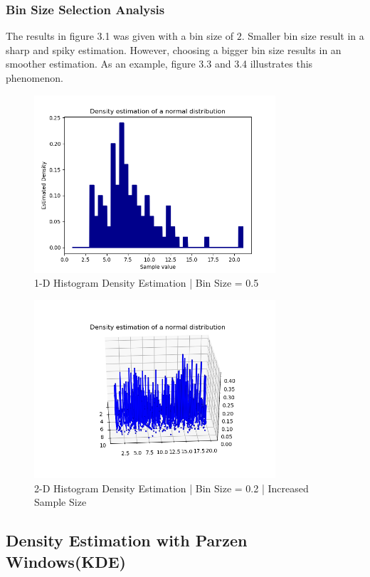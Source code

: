 \documentclass[12pt]{article}
\numberwithin{equation}{section}
\numberwithin{table}{section}
\numberwithin{figure}{section}
\begin{document}
\subsubsection*{Bin Size Selection Analysis}
The results in figure 3.1 was given with a bin size of $2$. Smaller bin size result in a sharp and spiky estimation. However, choosing a bigger bin size results in an smoother estimation. As an example, figure 3.3 and 3.4 illustrates this phenomenon.
	\begin{figure}[!h]\centering
	\includegraphics[width=0.8\textwidth]{3_a_3.PNG}
	\caption{1-D Histogram Density Estimation | Bin Size = 0.5}
	\label{pl1}
\end{figure}

	\begin{figure}[!h]\centering
	\includegraphics[width=0.8\textwidth]{3_a_4.PNG}
	\caption{2-D Histogram Density Estimation | Bin Size = 0.2 | Increased Sample Size}
	\label{pl1}
\end{figure}
\subsection*{Density Estimation with Parzen Windows(KDE)}
\end{document}
